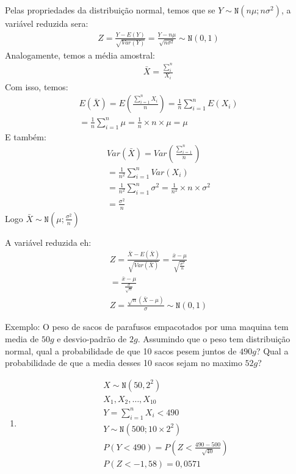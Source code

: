 \begin{description}
\begin{description}
  Pelas propriedades da distribuição normal, temos que se $Y\sim \mathtt{N}(n\mu; n\sigma^2)$, 
  a variável reduzida sera:
  \begin{align*}
    Z= \frac{Y- E(Y)}{\sqrt{Var(Y)}} = \frac{Y- n\mu}{\sqrt{n\sigma^2}} \sim \mathtt{N}(0,1)
  \end{align*}
  Analogamente, temos a média amostral:
  \begin{align*}
    \bar{X} = \frac{\sum_{i}^{n}}{X_i}
  \end{align*}
  Com isso, temos:
  \begin{align*}
    E(\bar{X}) = E( \frac{\sum_{i=1}^n X_i}{n} )= \frac{1}{n}\sum_{i=1}^{n} E(X_i) \\
    = \frac{1}{n} \sum_{i=1}^n \mu = \frac{1}{n} \times n \times \mu = \mu
  \end{align*}
  E também:
  \begin{align*}
    Var(\bar{X}) = Var(\frac{\sum_{i=1}^n}{n}) \\
    = \frac{1}{n^2} \sum_{i=1}^{n} Var(X_i) \\
    = \frac{1}{n^2} \sum_{i=1}^{n} \sigma^2 = \frac{1}{n^2} \times n \times \sigma^2 \\
    = \frac{\sigma^2}{n}
  \end{align*}
  Logo $\bar{X} \sim \mathtt{N} ( \mu ; \frac{\sigma^2}{n} ) $

  A variável reduzida eh:
  \begin{align*}
    Z = \frac{\bar{X}- E(\bar{X})}{\sqrt{Var(\bar{X})}} = \frac{\bar{x} - \mu}{\sqrt{\frac{\sigma^2}{n}}} \\
    = \frac{\bar{x}- \mu}{\frac{\sigma}{\sqrt{n}}} \\
    Z= \frac{\sqrt{n} (\bar{X} -\mu)}{\sigma} \sim \mathtt{N} (0,1)
  \end{align*}
\item {Exemplo:} O peso de sacos de parafusos empacotados por uma maquina tem media de $50g$ e desvio-padrão de $2g$.
  Assumindo que  o peso tem distribuição normal, qual a probabilidade de que 10 sacos pesem juntos de $490g$? 
  Qual a probabilidade de que a media desses 10 sacos sejam no maximo $52g$?

\begin{enumerate}[label=(\alph*)]
  \item
  \begin{align*}
    X \sim \mathtt{N} (50, 2^2) \\
    X_1, X_2, \ldots , X_{10 } \\
    Y= \sum_{i=1}^{n} X_i < 490 \\
    Y \sim \mathtt{N}(500 ; 10 \times 2^2) \\
    P(Y <490 ) = P(Z < \frac{490-500}{\sqrt{40}}) \\
    P(Z< -1,58) = 0,0571
  \end{align*}


\end{enumerate}
\end{description}
\end{description}
